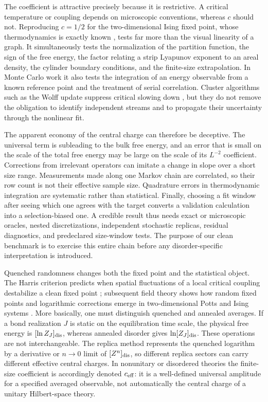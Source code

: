 \documentclass[aps,prb,reprint,superscriptaddress,longbibliography,floatfix]{revtex4-2}
\begin{document}
The coefficient is attractive precisely because it is restrictive.  A
critical temperature or coupling depends on microscopic conventions, whereas
$c$ should not.  Reproducing $c=1/2$ for the two-dimensional Ising fixed point,
whose thermodynamics is exactly known \cite{Onsager1944}, tests far more than
the visual linearity of a graph.  It simultaneously tests the normalization
of the partition function, the sign of the free energy, the factor relating a
strip Lyapunov exponent to an areal density, the cylinder boundary
conditions, and the finite-size extrapolation.  In Monte Carlo work it also
tests the integration of an energy observable from a known reference point
and the treatment of serial correlation.  Cluster algorithms such as the
Wolff update suppress critical slowing down \cite{Wolff1989}, but they do not
remove the obligation to identify independent streams and to propagate their
uncertainty through the nonlinear fit.

The apparent economy of the central charge can therefore be deceptive.
The universal term is subleading to the bulk free energy, and an error that is
small on the scale of the total free energy may be large on the scale of its
$L^{-2}$ coefficient.  Corrections from irrelevant operators can imitate a
change in slope over a short size range.  Measurements made along one Markov
chain are correlated, so their row count is not their effective sample size.
Quadrature errors in thermodynamic integration are systematic rather than
statistical.  Finally, choosing a fit window after seeing which one agrees
with the target converts a validation calculation into a selection-biased
one.  A credible result thus needs exact or microscopic oracles, nested
discretizations, independent stochastic replicas, residual diagnostics, and
predeclared size-window tests.  The purpose of our clean benchmark is to
exercise this entire chain before any disorder-specific interpretation is
introduced.

Quenched randomness changes both the fixed point and the statistical object.
The Harris criterion predicts when spatial fluctuations of a local critical
coupling destabilize a clean fixed point \cite{Harris1974}; subsequent field
theory shows how random fixed points and logarithmic corrections emerge in
two-dimensional Potts and Ising systems \cite{Ludwig1987}.  More basically,
one must distinguish quenched and annealed averages.  If a bond realization
$J$ is static on the equilibration time scale, the physical free energy is
$[\ln Z_J]_{\rm dis}$, whereas annealed disorder gives
$\ln[Z_J]_{\rm dis}$.  These operations are not interchangeable.  The replica
method represents the quenched logarithm by a derivative or $n\rightarrow0$
limit of $[Z^n]_{\rm dis}$, so different replica sectors can carry different
effective central charges.  In nonunitary or disordered theories the
finite-size coefficient is accordingly denoted $c_{\rm eff}$: it is a
well-defined universal amplitude for a specified averaged observable, not
automatically the central charge of a unitary Hilbert-space theory.
\end{document}
